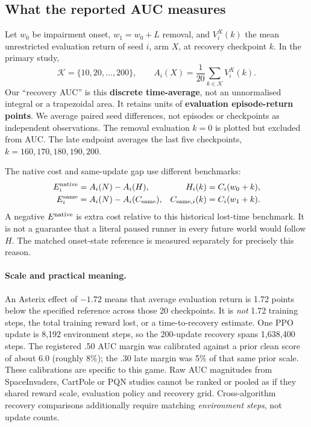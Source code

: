 \documentclass[10pt]{article}
\begin{document}
\subsection{What the reported AUC measures}\label{m:auc}
Let $w_0$ be impairment onset, $w_1=w_0+L$ removal, and $V_i^X(k)$ the mean unrestricted evaluation return of seed $i$, arm $X$, at recovery checkpoint $k$. In the primary study,
\begin{equation}
\mathcal K=\{10,20,\ldots,200\},\qquad
A_i(X)=\frac{1}{20}\sum_{k\in\mathcal K}V_i^X(k).
\end{equation}
Our ``recovery AUC'' is this \textbf{discrete time-average}, not an unnormalised integral or a trapezoidal area. It retains units of \textbf{evaluation episode-return points}. We average paired seed differences, not episodes or checkpoints as independent observations. The removal evaluation $k=0$ is plotted but excluded from AUC. The late endpoint averages the last five checkpoints, $k=160,170,180,190,200$.

The native cost and same-update gap use different benchmarks:
\begin{align}
E_i^{\rm native}&=A_i(N)-A_i(H), & H_i(k)&=C_i(w_0+k),\\
E_i^{\rm same}&=A_i(N)-A_i(C_{\rm same}), & C_{{\rm same},i}(k)&=C_i(w_1+k).
\end{align}
A negative $E^{\rm native}$ is extra cost relative to this historical lost-time benchmark. It is not a guarantee that a literal paused runner in every future world would follow $H$. The matched onset-state reference is measured separately for precisely this reason.

\paragraph{Scale and practical meaning.}
An Asterix effect of $-1.72$ means that average evaluation return is 1.72 points below the specified reference across those 20 checkpoints. It is \emph{not} 1.72 training steps, the total training reward lost, or a time-to-recovery estimate. One PPO update is 8{,}192 environment steps, so the 200-update recovery spans 1{,}638{,}400 steps. The registered .50 AUC margin was calibrated against a prior clean score of about 6.0 (roughly 8\%); the .30 late margin was 5\% of that same prior scale. These calibrations are specific to this game. Raw AUC magnitudes from SpaceInvaders, CartPole or PQN studies cannot be ranked or pooled as if they shared reward scale, evaluation policy and recovery grid. Cross-algorithm recovery comparisons additionally require matching \emph{environment steps}, not update counts.
\end{document}
